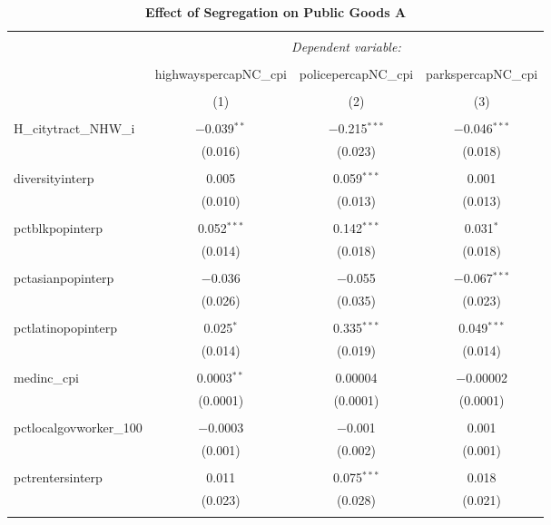 \documentclass[]{article}
\begin{document}
\begin{table}[!htbp] \centering 
  \caption{\textbf{Effect of Segregation on Public Goods A}} 
  \label{} 
\begin{tabular}{@{\extracolsep{5pt}}lccc} 
\\[-1.8ex]\hline 
\hline \\[-1.8ex] 
 & \multicolumn{3}{c}{\textit{Dependent variable:}} \\ 
\cline{2-4} 
\\[-1.8ex] & highwayspercapNC\_cpi & policepercapNC\_cpi & parkspercapNC\_cpi \\ 
\\[-1.8ex] & (1) & (2) & (3)\\ 
\hline \\[-1.8ex] 
 H\_citytract\_NHW\_i & $-$0.039$^{**}$ & $-$0.215$^{***}$ & $-$0.046$^{***}$ \\ 
  & (0.016) & (0.023) & (0.018) \\ 
  & & & \\ 
 diversityinterp & 0.005 & 0.059$^{***}$ & 0.001 \\ 
  & (0.010) & (0.013) & (0.013) \\ 
  & & & \\ 
 pctblkpopinterp & 0.052$^{***}$ & 0.142$^{***}$ & 0.031$^{*}$ \\ 
  & (0.014) & (0.018) & (0.018) \\ 
  & & & \\ 
 pctasianpopinterp & $-$0.036 & $-$0.055 & $-$0.067$^{***}$ \\ 
  & (0.026) & (0.035) & (0.023) \\ 
  & & & \\ 
 pctlatinopopinterp & 0.025$^{*}$ & 0.335$^{***}$ & 0.049$^{***}$ \\ 
  & (0.014) & (0.019) & (0.014) \\ 
  & & & \\ 
 medinc\_cpi & 0.0003$^{**}$ & 0.00004 & $-$0.00002 \\ 
  & (0.0001) & (0.0001) & (0.0001) \\ 
  & & & \\ 
 pctlocalgovworker\_100 & $-$0.0003 & $-$0.001 & 0.001 \\ 
  & (0.001) & (0.002) & (0.001) \\ 
  & & & \\ 
 pctrentersinterp & 0.011 & 0.075$^{***}$ & 0.018 \\ 
  & (0.023) & (0.028) & (0.021) \\ 
  & & & \\ 

\end{tabular}
\end{table}
\end{document}
